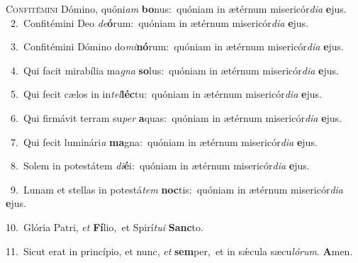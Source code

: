 \lettrine{\initial\textcolor{\initialcolor}{C}}{onfitémini} Dómino, quóni\textit{am} \textbf{bo}\-nus:~\star quóniam in ætérnum misericór\-\textit{di}\-\textit{a} \textbf{e}\-jus.\\
{\numbfont\textcolor{\numbcolor}{~2.}}~Confitémini Deo \textit{de}\-\textbf{ó}rum:~\star quóniam in ætérnum misericór\-\textit{di}\-\textit{a} \textbf{e}\-jus.\par
{\numbfont\textcolor{\numbcolor}{~3.}}~Confitémini Dómino do\-\textit{mi}\-\textbf{nó}rum:~\star quóniam in ætérnum misericór\-\textit{di}\-\textit{a} \textbf{e}\-jus.\par
{\numbfont\textcolor{\numbcolor}{~4.}}~Qui facit mirabília ma\textit{gna} \textbf{so}\-lus:~\star quóniam in ætérnum misericór\-\textit{di}\-\textit{a} \textbf{e}\-jus.\par
{\numbfont\textcolor{\numbcolor}{~5.}}~Qui fecit cælos in in\-\textit{tel}\-\textbf{léc}tu:~\star quóniam in ætérnum misericór\-\textit{di}\-\textit{a} \textbf{e}\-jus.\par
{\numbfont\textcolor{\numbcolor}{~6.}}~Qui firmávit terram su\textit{per} \textbf{a}\-quas:~\star quóniam in ætérnum misericór\-\textit{di}\-\textit{a} \textbf{e}\-jus.\par
{\numbfont\textcolor{\numbcolor}{~7.}}~Qui fecit luminári\textit{a} \textbf{ma}\-gna:~\star quóniam in ætérnum misericór\-\textit{di}\-\textit{a} \textbf{e}\-jus.\par
{\numbfont\textcolor{\numbcolor}{~8.}}~Solem in potestátem \textit{di}\-\textbf{é}i:~\star quóniam in ætérnum misericór\-\textit{di}\-\textit{a} \textbf{e}\-jus.\par
{\numbfont\textcolor{\numbcolor}{~9.}}~Lunam et stellas in potestá\textit{tem} \textbf{noc}\-tis:~\star quóniam in ætérnum misericór\-\textit{di}\-\textit{a} \textbf{e}\-jus.\par
{\numbfont\textcolor{\numbcolor}{10.}}~Glória Patri, \textit{et} \textbf{Fí}\-lio,~\star et Spirí\-\textit{tu}\-\textit{i} \textbf{Sanc}\-to.\par
{\numbfont\textcolor{\numbcolor}{11.}}~Sicut erat in princípio, et nunc, \textit{et} \textbf{sem}\-per,~\star et in sǽcula sæcu\-\textit{ló}\-\textit{rum}. \textbf{A}\-men.\par

